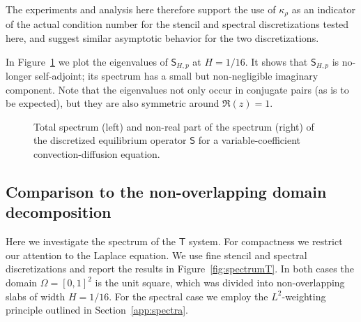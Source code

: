 \documentclass[final,onefignum,onetabnum]{siamart250211}
\newcommand{\mtx}[1]{\bm{\mathsf{#1}}}
\theoremstyle{definition}
\begin{document}
The experiments and analysis here therefore support the use of $\kappa_{\rho}$ as an indicator of the actual condition number for the stencil and spectral discretizations tested here, and suggest similar asymptotic behavior for the two discretizations.

In Figure~\ref{fig:eigValsVC} we plot the eigenvalues of $\mtx{S}_{H,p}$ at $H=1/16$. It shows that $\mtx{S}_{H,p}$ is no-longer self-adjoint; its spectrum has a small but non-negligible imaginary component. Note that the eigenvalues not only occur in conjugate pairs (as is to be expected), but they are also symmetric around $\Re(z)=1$.


\begin{figure}[H]
    \centering
    \begin{subfigure}{.48\linewidth}
    \end{subfigure}
\hfill
\begin{subfigure}{.48\linewidth}
    \end{subfigure}    
    \caption{Total spectrum (left) and non-real part of the spectrum (right) of the discretized equilibrium operator $\mtx{S}$ for a variable-coefficient convection-diffusion equation.}
    \label{fig:eigValsVC}
\end{figure}
\subsection{Comparison to the non-overlapping domain decomposition}\label{app:Tsys}
Here we investigate the spectrum of the $\mtx{T}$ system. For compactness we restrict our attention to the Laplace equation. We use fine stencil and spectral discretizations and report the results in Figure~\ref{fig:spectrumT}. In both cases the domain $\Omega=[0,1]^2$ is the unit square, which was divided into non-overlapping slabs of width $H=1/16$. For the spectral case we employ the $L^2$-weighting principle outlined in Section~\ref{app:spectra}.
\end{document}
